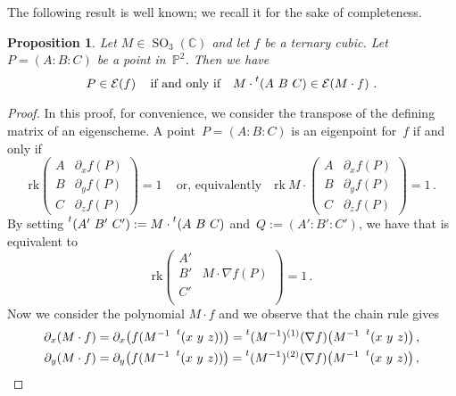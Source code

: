 \documentclass[a4paper, 11pt, reqno]{amsart}
\theoremstyle{plain}
\newtheorem{prop}[lemma]{Proposition}
\theoremstyle{definition}
\newcommand{\C}{\mathbb{C}}
\newcommand{\p}{\mathbb{P}}
\newcommand{\de}{\partial}
\newcommand{\rk}{\ensuremath{\mathrm{rk}}}
\newcommand{\SO}{\operatorname{SO}}
\newcommand{\Eig}[1]{\mathcal{E}\!\left( {#1} \right)}
\begin{document}
The following result is well known; we recall it for the sake of completeness.

\begin{prop}
Let $M \in \SO_3(\C)$ and let $f$ be a ternary cubic.
Let $P = (A: B: C)$ be a point in~$\p^2$.
Then we have
%
\[
  P \in \Eig{f}
  \quad \text{if and only if} \quad
  M \cdot \prescript{t} {}(A \ B \ C) \in \Eig{M \cdot f} \,.
\]
%
\end{prop}
\begin{proof}
In this proof, for convenience,
we consider the transpose of the defining matrix of an eigenscheme.
A point~$P = (A: B: C)$ is an eigenpoint for~$f$ if and only if
%
\begin{equation}
\label{eq:def_matrix_M}
  \mathrm{rk}
  \begin{pmatrix}
    A & \de_x f(P) \\
    B & \de_y f(P) \\
    C & \de_z f(P)
  \end{pmatrix}
  = 1 \,
 \quad \text{or, equivalently} \quad
  \mathrm{rk} \ M \cdot 
  \begin{pmatrix}
    A & \de_x f(P) \\
    B & \de_y f(P) \\
    C & \de_z f(P)
  \end{pmatrix}
  = 1 \,.
\end{equation}
%
By setting $\prescript{t} {}(A' \ B' \ C' ) := M \cdot \prescript{t} {}(A \ B \ C) $ and~$Q := (A':B':C')$, we have that 
is equivalent to
%
\begin{equation}
\label{eq:transformed}
  \rk
  \begin{pmatrix}
    A' & \\
    B' & M \cdot \nabla f (P) \\
    C' & \\
  \end{pmatrix}
  = 1 \,.
\end{equation}
%
Now we consider the polynomial $M \cdot f$ and we observe that the chain rule gives
%
\begin{gather*}
  \partial_x (M\cdot f) = \partial_x \bigl( f(M^{-1} \ \prescript{t} {} (x \ y \ z)) \bigr) = \prescript{t} {}(M^{-1})^{(1)}(\nabla f) \bigl( M^{-1}\ \prescript{t} {} (x \ y \ z) \bigr) \,, \\
  \partial_y (M\cdot f) = \partial_y \bigl( f(M^{-1} \ \prescript{t} {} (x \ y \ z)) \bigr) = \prescript{t} {}(M^{-1})^{(2)}(\nabla f) \bigl( M^{-1}\ \prescript{t} {} (x \ y \ z) \bigr) \,, \\

\end{gather*}
\end{proof}
\end{document}
